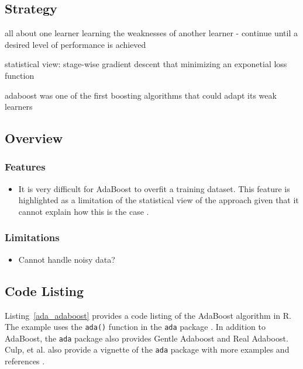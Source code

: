 \subsection{Strategy}

all about one learner learning the weaknesses of another learner - continue until a desired level of performance is achieved

statistical view: stage-wise gradient descent that minimizing an exponetial loss function

adaboost was one of the first boosting algorithms that could adapt its weak learners


\subsection{Overview}

\subsubsection{Features}

\begin{itemize}
	\item It is very difficult for AdaBoost to overfit a training dataset. This feature is highlighted as a limitation of the statistical view of the approach given that it cannot explain how this is the case \cite{Mease2008}.
\end{itemize}

\subsubsection{Limitations}

\begin{itemize}
	\item Cannot handle noisy data? \cite{Long2010}
\end{itemize}


\subsection{Code Listing}
Listing~\ref{ada_adaboost} provides a code listing of the AdaBoost algorithm in R.
The example uses the \texttt{ada()} function in the \texttt{ada} package \cite{Culp2007}. In addition to AdaBoost, the \texttt{ada} package also provides Gentle Adaboost and Real Adaboost.
Culp, et al. also provide a vignette of the \texttt{ada} package with more examples and references \cite{Culp2006}.

